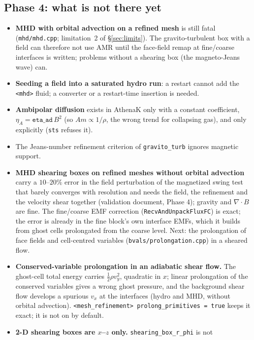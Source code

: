 \documentclass[11pt]{article}
\newcommand{\code}[1]{\texttt{#1}}
\newcommand{\file}[1]{\texttt{\small #1}}
\newcommand{\fn}[1]{\texttt{\small #1}}
\begin{document}
\subsection{Phase 4: what is not there yet}
\label{sec:phase4limits}
\begin{itemize}\itemsep2pt
\item \textbf{MHD with orbital advection on a refined mesh} is still fatal
      (\file{mhd/mhd.cpp}; limitation~2 of \S\ref{sec:limits}). The gravito-turbulent box
      with a field can therefore not use AMR until the face-field remap at fine/coarse
      interfaces is written; problems without a shearing box (the magneto-Jeans wave) can.
\item \textbf{Seeding a field into a saturated hydro run}: a restart cannot add the
      \code{<mhd>} fluid; a converter or a restart-time insertion is needed.
\item \textbf{Ambipolar diffusion} exists in AthenaK only with a constant coefficient,
      $\eta_A = \code{eta\_ad}\,B^2$ (so $Am \propto 1/\rho$, the wrong trend for collapsing
      gas), and only explicitly (\code{sts} refuses it).
\item The Jeans-number refinement criterion of \code{gravito\_turb} ignores magnetic support.
\item \textbf{MHD shearing boxes on refined meshes without orbital advection} carry a
      $10$--$20\%$ error in the field perturbation of the magnetized swing test that barely
      converges with resolution and needs the field, the refinement and the velocity shear
      together (validation document, Phase 4); gravity and $\nabla\!\cdot\!B$ are fine. The
      fine/coarse EMF correction (\fn{RecvAndUnpackFluxFC}) is exact; the error is already in
      the fine block's own interface EMFs, which it builds from ghost cells prolongated from
      the coarse level. Next: the prolongation of face fields and cell-centred variables
      (\file{bvals/prolongation.cpp}) in a sheared flow.
\item \textbf{Conserved-variable prolongation in an adiabatic shear flow.} The ghost-cell
      total energy carries $\tfrac12\rho v_y^2$, quadratic in $x$; linear prolongation of the
      conserved variables gives a wrong ghost pressure, and the background shear flow
      develops a spurious $v_x$ at the interfaces (hydro and MHD, without orbital advection).
      \code{<mesh\_refinement> prolong\_primitives = true} keeps it exact; it is not on by
      default.
\item \textbf{2-D shearing boxes are $x$--$z$ only.} \code{shearing\_box\_r\_phi} is not

\end{itemize}
\end{document}
